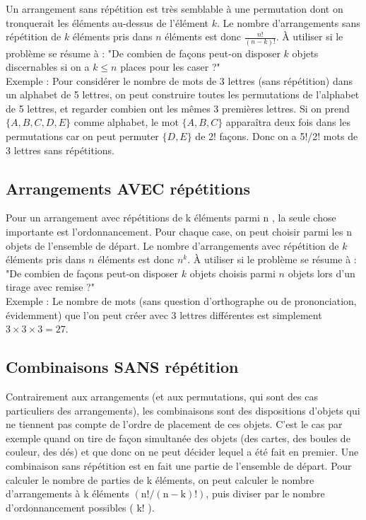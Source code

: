 Un arrangement sans répétition est très semblable à une permutation dont on tronquerait les éléments au-dessus de l'élément \(k\). Le nombre d'arrangements sans répétition de \(k\) éléments pris dans \(n\) éléments est donc \(\frac{n!}{(n-k)!}\).
À utiliser si le problème se résume à : "De combien de façons peut-on disposer \(k\) objets discernables si on a \(k \leq n\) places pour les caser ?"\\

Exemple : Pour considérer le nombre de mots de 3 lettres (sans répétition) dans un alphabet de 5 lettres, on peut construire toutes les permutations de l'alphabet de 5 lettres, et regarder combien ont les mêmes 3 premières lettres. Si on prend \(\{A, B, C, D, E\}\) comme alphabet, le mot \(\{A, B, C\}\) apparaîtra deux fois dans les permutations car on peut permuter \(\{D, E\}\) de 2! façons. Donc on a 5!/2! mots de 3 lettres sans répétitions.



\subsection{Arrangements AVEC répétitions}

Pour un arrangement avec répétitions de k éléments parmi n , la seule chose importante est l'ordonnancement. Pour chaque case, on peut choisir parmi les n objets de l'ensemble de départ. Le nombre d'arrangements avec répétition de \(k\) éléments pris dans \(n\) éléments est donc \(n^{k}\). À utiliser si le problème se résume à : "De combien de façons peut-on disposer \(k\) objets choisis parmi \(n\) objets lors d'un tirage avec remise ?"\\

Exemple : Le nombre de mots (sans question d'orthographe ou de prononciation, évidemment) que l'on peut créer avec 3 lettres différentes est simplement \(3 \times 3 \times 3=27\). \\


\subsection{Combinaisons SANS répétition}

Contrairement aux arrangements (et aux permutations, qui sont des cas particuliers des arrangements), les combinaisons sont des dispositions d'objets qui ne tiennent pas compte de l'ordre de placement de ces objets. C'est le cas par exemple quand on tire de façon simultanée des objets (des cartes, des boules de couleur, des dés) et que donc on ne peut décider lequel a été fait en premier.
Une combinaison sans répétition est en fait une partie de l'ensemble de départ. Pour calculer le nombre de parties de k éléments, on peut calculer le nombre d'arrangements à k éléments
\((\mathrm{n}!/(\mathrm{n}-\mathrm{k})!)\), puis diviser par le nombre d'ordonnancement possibles ( \(\mathrm{k}!\) ).

